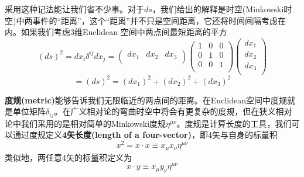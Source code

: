 采用这种记法能让我们省不少事。对于$ds$，我们给出的解释是时空(Minkowski时空)中两事件的“距离”，这个“距离”并不只是空间距离，它还将时间间隔考虑在内。如果我们考虑3维Euclidean 空间中两点间最短距离的平方
\[
  (ds)^2=dx_i \delta^{ij} dx_j
  =\left(
     \begin{array}{ccc}
     dx_1 & dx_2 & dx_3 \\
     \end{array}
   \right)
   \left(
     \begin{array}{ccc}
       1 & 0 & 0  \\
       0 & 1 & 0  \\
        0 & 0 & 1  \\
     \end{array}
   \right)
   \left(
     \begin{array}{c}
        dx_1 \\
       dx_2 \\
        dx_3\\
     \end{array}
   \right)
   \]
\begin{equation}\label{eq2.27}
  =(ds)^2=(dx_1)^2+(dx_2)^2+(dx_3)^2
\end{equation}

{\bf{度规(metric)}}能够告诉我们无限临近的两点间的距离。在Euclidean空间中度规就是单位矩阵$\delta_{ij}$。在广义相对论的弯曲时空中将会有更复杂的度规，但在狭义相对论中我们采用的是相对简单的Minkowski度规$\eta^{\mu\nu}$。度规是计算长度的工具，我们可以通过度规定义{\bf{4矢长度(length of a four-vector)}}，即4矢与自身的标量积
\[
x^2=x \cdot x \equiv x_\mu x_\nu \eta^{\mu\nu}
\]
类似地，两任意4矢的标量积定义为
\begin{equation}\label{eq2.28}
  x\cdot y\equiv x_\mu y_\nu \eta^{\mu\nu}
\end{equation}

